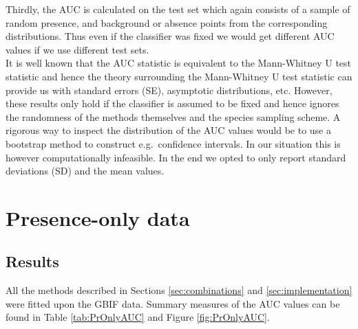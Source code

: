 Thirdly, the AUC is calculated on the test set which again consists of a sample of random presence, and background or absence points from the corresponding distributions. Thus even if the classifier was fixed we would get different AUC values if we use different test sets. \\

It is well known that the AUC statistic is equivalent to the Mann-Whitney U test statistic \parencite{hanley_meaning_1982} and hence the theory surrounding the Mann-Whitney U test statistic can provide us with standard errors (SE), asymptotic distributions, etc. However, these results only hold if the classifier is assumed to be fixed and hence ignores the randomness of the methods themselves and the species sampling scheme. A rigorous way to inspect the distribution of the AUC values would be to use a bootstrap method to construct e.g.\ confidence intervals. In our situation this is however computationally infeasible. In the end we opted to only report standard deviations (SD) and the mean values.\\

\section{Presence-only data}

\subsection{Results}
All the methods described in Sections \ref{sec:combinations} and \ref{sec:implementation} were fitted upon the GBIF data. Summary measures of the AUC values can be found in Table \ref{tab:PrOnlyAUC} and Figure \ref{fig:PrOnlyAUC}.


